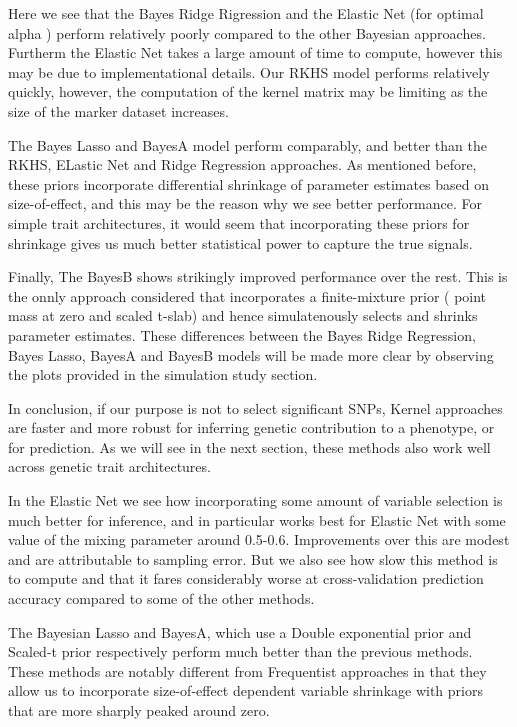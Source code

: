 \documentclass{sig-alternate-05-2015}
\begin{document}
Here we see that the Bayes Ridge Rigression and the Elastic Net (for optimal alpha ) perform relatively poorly
compared to the other Bayesian approaches. Furtherm the Elastic Net takes a large amount of time to compute, however this may be due to implementational
details. Our RKHS model performs relatively quickly, however, the computation of the kernel matrix may be limiting as the size of the marker dataset increases.

The Bayes Lasso and BayesA model perform comparably, and better than the RKHS, ELastic Net and Ridge Regression approaches. As mentioned before,
these priors incorporate differential shrinkage of parameter estimates based on size-of-effect, and this may be the reason why we see better performance.
For simple trait architectures, it would seem that incorporating these priors for shrinkage gives us much better statistical power to capture the true signals.

Finally, The BayesB shows strikingly improved performance over the rest.
This is the onnly approach considered that incorporates a finite-mixture prior ( point mass at zero and
scaled t-slab) and hence simulatenously selects and shrinks parameter estimates.
These differences between the Bayes Ridge Regression, Bayes Lasso, BayesA and BayesB models will be made more clear
by observing the plots provided in the simulation study section.

In conclusion,
if our purpose is not to select significant SNPs, Kernel approaches are faster and more robust for inferring genetic contribution to a phenotype, or
for prediction. As we will see in the next section, these methods also work well across genetic trait architectures.

In the Elastic Net we see how incorporating some amount of variable selection is much better for inference, and in particular works best for Elastic Net with some
value of the mixing parameter around 0.5-0.6. Improvements over this are modest and are attributable to sampling error.
But we also see how slow this method is to compute and that it fares considerably worse at cross-validation prediction accuracy compared to some
of the other methods.

The Bayesian Lasso and BayesA, which use a Double exponential prior and Scaled-t prior respectively perform much better than the previous methods.
These methods are notably different from Frequentist approaches in that they allow us to incorporate size-of-effect dependent variable shrinkage with priors that are more
sharply peaked around zero.
\end{document}
